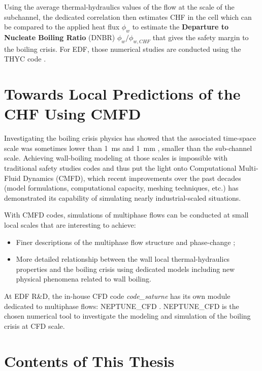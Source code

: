 \npar

Using the average thermal-hydraulics values of the flow at the scale of the subchannel, the dedicated correlation then estimates CHF in the cell which can be compared to the applied heat flux $\phi_{w}$ to estimate the \textbf{Departure to Nucleate Boiling Ratio} (DNBR) $\phi_{w} / \phi_{w,CHF}$ that gives the safety margin to the boiling crisis. For EDF, those numerical studies are conducted using the THYC code \cite{aubry_thyc_1995}.

\section{Towards Local Predictions of the CHF Using CMFD}

Investigating the boiling crisis physics has showed that the associated time-space scale was sometimes lower than 1\ ms and 1\ mm \cite{bloch_study_2016}, \ie smaller than the sub-channel scale. Achieving wall-boiling modeling at those scales is impossible with traditional safety studies codes and thus put the light onto Computational Multi-Fluid Dynamics (CMFD), which recent improvements over the past decades (model formulations, computational capacity, meshing techniques, etc.) has demonstrated its capability of simulating nearly industrial-scaled situations.

\npar

With CMFD codes, simulations of multiphase flows can be conducted at small local scales that are interesting to achieve:
\begin{itemize}
\item Finer descriptions of the multiphase flow structure and phase-change ;\
\item More detailed relationship between the wall local thermal-hydraulics properties and the boiling crisis using dedicated models including new physical phenomena related to wall boiling.
\end{itemize} 

At EDF R\&D, the in-house CFD code \textit{code\_saturne} has its own module dedicated to multiphase flows: NEPTUNE\_CFD \cite{guelfi_neptune_2007}. NEPTUNE\_CFD is the chosen numerical tool to investigate the modeling and simulation of the boiling crisis at CFD scale.


\section{Contents of This Thesis}

